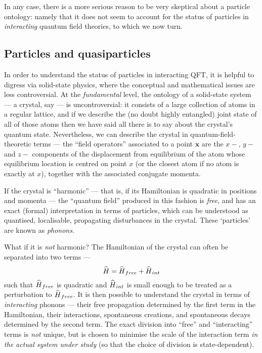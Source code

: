 \documentclass[12pt]{article}
\newcommand{\be}{\begin{equation}}
\newcommand{\ee}{\end{equation}}
\newcommand{\vctr}[1]{\ensuremath{\mathbf{ #1 }}}
\newcommand{\op}[1]{\ensuremath{\widehat{\textsf{\ensuremath{#1}}}}}
\begin{document}
In any case, there is a more serious  reason to be very skeptical about a particle ontology: namely that it does not seem to account for the status of particles in  \emph{interacting} quantum field theories, to which we now turn.

\subsection{Particles and quasiparticles}\label{DMWWparticles}

In order to understand the status of particles in interacting QFT, it is helpful to digress via solid-state physics, where the conceptual and mathematical issues are less controversial. At the \emph{fundamental} level, the ontology of a solid-state system --- a crystal, say --- is uncontroversial: it consists of a large collection of atoms in a regular lattice, and if we describe the (no doubt highly entangled) joint state of all of those atoms then we have said all there is to say about the crystal's quantum state. Nevertheless, we can describe the crystal in quantum-field-theoretic terms --- the ``field operators'' associated to a point $\vctr{x}$ are the  $x-$, $y-$ and $z-$ components of the displacement from equilibrium of the atom whose equilibrium location is centred on point $x$ (or the closest atom if no atom is exactly at $x$), together with the associated conjugate momenta. 

If the crystal is ``harmonic'' --- that is, if its Hamiltonian is quadratic in positions and momenta --- the ``quantum field'' produced in this fashion is \emph{free}, and has an exact (formal) interpretation in terms of particles, which can be understood as quantised, localisable, propagating disturbances in the crystal. These `particles' are known as \emph{phonons}.

What if it is \emph{not} harmonic? The Hamiltonian of the crystal can often be separated into two terms ---
\be
\op{H}=\op{H}_{free}+\op{H}_{int}
\ee
such that $\op{H}_{free}$ is quadratic and $\op{H}_{int}$ is small enough to be treated as a perturbation to $\op{H}_{free}$. It is then possible to understand the crystal in terms of \emph{interacting} phonons --- their free propagation determined by the first term in the Hamiltonian, their interactions, spontaneous creations, and spontaneous decays determined by the second term. The exact division into ``free'' and ``interacting'' terms is \emph{not} unique, but is chosen to minimise the scale of the interaction term \emph{in the actual system under study} (so that the choice of division is state-dependent). 
\end{document}
